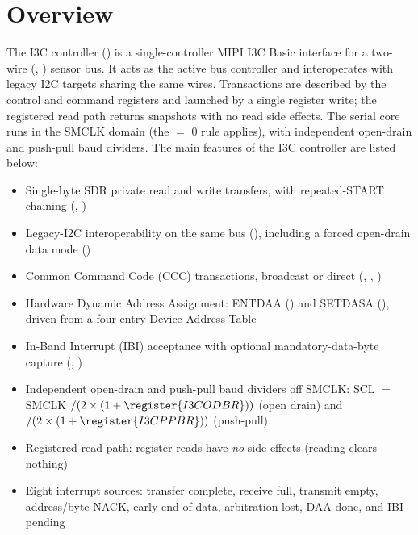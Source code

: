 \section{Overview}

The I3C controller () is a single-controller MIPI I3C Basic interface for a two-wire (, ) sensor bus. It acts as the active bus controller and interoperates with legacy I2C targets sharing the same wires. Transactions are described by the control and command registers and launched by a single register write; the registered read path returns snapshots with no read side effects. The serial core runs in the SMCLK domain (the  $=$ 0 rule applies), with independent open-drain and push-pull baud dividers. The main features of the I3C controller are listed below:

\begin{itemize}
	\item Single-byte SDR private read and write transfers, with repeated-START chaining (, )
	\item Legacy-I2C interoperability on the same bus (), including a forced open-drain data mode ()
	\item Common Command Code (CCC) transactions, broadcast or direct (, , )
	\item Hardware Dynamic Address Assignment: ENTDAA () and SETDASA (), driven from a four-entry Device Address Table
	\item In-Band Interrupt (IBI) acceptance with optional mandatory-data-byte capture (, )
	\item Independent open-drain and push-pull baud dividers off SMCLK: SCL $=$ SMCLK $/ (2 \times (1 + \register{I3CODBR}))$ (open drain) and $/ (2 \times (1 + \register{I3CPPBR}))$ (push-pull)
	\item Registered read path: register reads have \emph{no} side effects (reading  clears nothing)
	\item Eight interrupt sources: transfer complete, receive full, transmit empty, address/byte NACK, early end-of-data, arbitration lost, DAA done, and IBI pending
\end{itemize}

